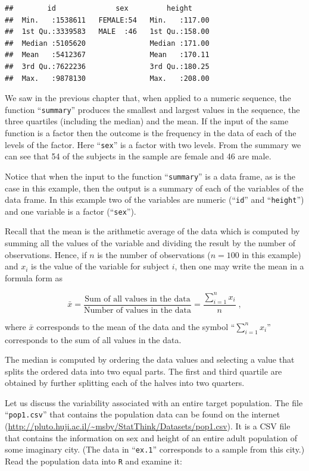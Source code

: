 \documentclass[]{krantz}
\theoremstyle{definition}
\theoremstyle{definition}
\theoremstyle{definition}
\theoremstyle{remark}
\begin{document}
\begin{verbatim}
##        id              sex         height      
##  Min.   :1538611   FEMALE:54   Min.   :117.00  
##  1st Qu.:3339583   MALE  :46   1st Qu.:158.00  
##  Median :5105620               Median :171.00  
##  Mean   :5412367               Mean   :170.11  
##  3rd Qu.:7622236               3rd Qu.:180.25  
##  Max.   :9878130               Max.   :208.00
\end{verbatim}

We saw in the previous chapter that, when applied to a numeric sequence,
the function ``\texttt{summary}'' produces the smallest and largest
values in the sequence, the three quartiles (including the median) and
the mean. If the input of the same function is a factor then the outcome
is the frequency in the data of each of the levels of the factor. Here
``\texttt{sex}'' is a factor with two levels. From the summary we can
see that 54 of the subjects in the sample are female and 46 are male.

Notice that when the input to the function ``\texttt{summary}'' is a
data frame, as is the case in this example, then the output is a summary
of each of the variables of the data frame. In this example two of the
variables are numeric (``\texttt{id}'' and ``\texttt{height}'') and one
variable is a factor (``\texttt{sex}'').

Recall that the mean is the arithmetic average of the data which is
computed by summing all the values of the variable and dividing the
result by the number of observations. Hence, if \(n\) is the number of
observations (\(n=100\) in this example) and \(x_i\) is the value of the
variable for subject \(i\), then one may write the mean in a formula
form as

\[\bar x = \frac{\mbox{Sum of all values in the data}}{\mbox{Number of values in the data}} = \frac{\sum_{i=1}^n x_i}{n}\;,\]

where \(\bar x\) corresponds to the mean of the data and the symbol
``\(\sum_{i=1}^n x_i\)'' corresponds to the sum of all values in the
data.

The median is computed by ordering the data values and selecting a value
that splits the ordered data into two equal parts. The first and third
quartile are obtained by further splitting each of the halves into two
quarters.

Let us discuss the variability associated with an entire target
population. The file ``\texttt{pop1.csv}'' that contains the population
data can be found on the internet
(\url{http://pluto.huji.ac.il/~msby/StatThink/Datasets/pop1.csv}). It is
a CSV file that contains the information on sex and height of an entire
adult population of some imaginary city. (The data in ``\texttt{ex.1}''
corresponds to a sample from this city.) Read the population data into
\texttt{R} and examine it:
\end{document}
